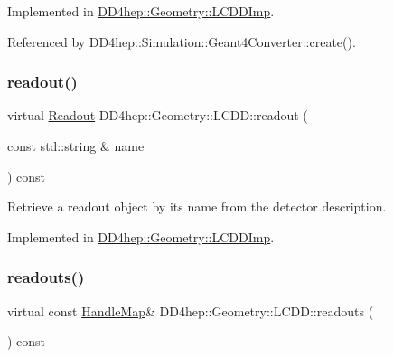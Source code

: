 Implemented in \hyperlink{class_d_d4hep_1_1_geometry_1_1_l_c_d_d_imp_af2cb6b9930250633970547bba6c93e87}{D\+D4hep\+::\+Geometry\+::\+L\+C\+D\+D\+Imp}.



Referenced by D\+D4hep\+::\+Simulation\+::\+Geant4\+Converter\+::create().

\hypertarget{class_d_d4hep_1_1_geometry_1_1_l_c_d_d_aa29f75fba9942edd7f73226a11c9598e}{}\label{class_d_d4hep_1_1_geometry_1_1_l_c_d_d_aa29f75fba9942edd7f73226a11c9598e} 
\subsubsection{\texorpdfstring{readout()}{readout()}}
{\footnotesize\ttfamily virtual \hyperlink{class_d_d4hep_1_1_geometry_1_1_readout}{Readout} D\+D4hep\+::\+Geometry\+::\+L\+C\+D\+D\+::readout (\begin{DoxyParamCaption}\item[{const std\+::string \&}]{name }\end{DoxyParamCaption}) const\hspace{0.3cm}{\ttfamily [pure virtual]}}



Retrieve a readout object by it\textquotesingle{}s name from the detector description. 



Implemented in \hyperlink{class_d_d4hep_1_1_geometry_1_1_l_c_d_d_imp_a96ec876212352ee837eb6358e7c55333}{D\+D4hep\+::\+Geometry\+::\+L\+C\+D\+D\+Imp}.

\hypertarget{class_d_d4hep_1_1_geometry_1_1_l_c_d_d_a5c815f21643ebb5cce9d1d1e71772431}{}\label{class_d_d4hep_1_1_geometry_1_1_l_c_d_d_a5c815f21643ebb5cce9d1d1e71772431} 
\subsubsection{\texorpdfstring{readouts()}{readouts()}}
{\footnotesize\ttfamily virtual const \hyperlink{class_d_d4hep_1_1_geometry_1_1_l_c_d_d_a05cb11e7355772c7b0794bcca59bf477}{Handle\+Map}\& D\+D4hep\+::\+Geometry\+::\+L\+C\+D\+D\+::readouts (\begin{DoxyParamCaption}{ }\end{DoxyParamCaption}) const\hspace{0.3cm}{\ttfamily [pure virtual]}}



